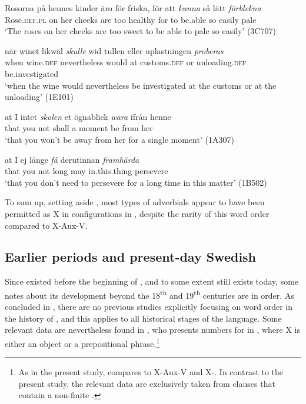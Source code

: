 \documentclass[output=paper, colorlinks, citecolor=brown]{langscibook}
\begin{document}
\ea
\label{ex:sangfelt:26}
\ea \label{ex:sangfelt:26a}
\gll Rosorna på hennes kinder äro för friska, för att \textit{kunna} {så} {lätt} \textit{förblekna}\\ %
 Rose.\textsc{def.pl} on her cheeks are too healthy for to be.able so easily pale\\
\glt ‘The roses on her cheeks are too sweet to be able to pale so easily’ (3C707)

\ex\label{ex:sangfelt:26b}
\gll när winet likwäl \textit{skulle} {wid} {tullen} {eller} {uplastningen} \textit{proberas}\\
 when wine.\textsc{def} nevertheless would at customs.\textsc{def} or unloading.\textsc{def} be.investigated\\
\glt ‘when the wine would nevertheless be investigated at the customs or at the unloading’ (1E101)

\ex\label{ex:sangfelt:26c}
\gll at I intet \textit{skolen} {et} {ögnablick} \textit{wara} ifrån henne \\
 that you not shall a moment be from her\\
\glt ‘that you won’t be away from her for a single moment’ (1A307)

\ex\label{ex:sangfelt:26d}
\gll at I ej länge \textit{få} {derutinnan} \textit{framhärda} \\
 that you not long may in.this.thing persevere\\
\glt ‘that you don’t need to persevere for a long time in this matter’ (1B502)
\z
\z 


 To sum up, setting aside , most types of adverbials appear to have been permitted as X in  configurations in , despite the rarity of this word order compared to X-Aux-V.

\subsection{Earlier periods and present-day Swedish}\label{sec:sangfelt:4.3}\largerpage[2]

 Since  existed before the beginning of , and to some extent still exists today, some notes about its development beyond the 18\textsuperscript{th} and 19\textsuperscript{th} centuries are in order. As concluded in , there are no previous studies explicitly focusing on  word order in the history of , and this applies to all historical stages of the language. Some relevant data are nevertheless found in \citet{Sangfelt2019}, who presents numbers for  in , where X is either an object or a prepositional phrase.\footnote{As in the present study, \citet{Sangfelt2019} compares  to X-Aux-V and X-. In contrast to the present study, the relevant data are exclusively taken from clauses that contain a non-finite .}
\end{document}
